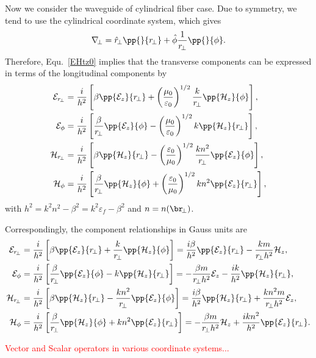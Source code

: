 Now we consider the waveguide of cylindrical fiber case. Due to symmetry, we tend to use the 
cylindrical coordinate system, which gives 
\begin{align}
\nabla\!_\perp = \hat{r}\!_\perp \pp{}{r\!_\perp} + \hat{\phi} \frac{1}{r\!_\perp} \pp{}{\phi}.
\end{align}
Therefore, Equ.~\ref{EHtz0} implies that the transverse components can be expressed in terms of the 
longitudinal components by
\begin{subequations}
\begin{align}
\mathcal{E}_{r\!_\perp} &= \frac{i}{h^2} \left[ \beta \pp{\mathcal{E}_z }{r\!_\perp} + 
\left(\frac{\mu_0}{\varepsilon_0} \right)^{1/2}  \frac{k}{r\!_\perp} 
\pp{\mathcal{H}_z}{\phi} \right], \\
\mathcal{E}_\phi &= \frac{i}{h^2} \left[\frac{\beta}{r\!_\perp} 
\pp{\mathcal{E}_z}{\phi} -\left(\frac{\mu_0}{\varepsilon_0} \right) ^{1/2} k 
\pp{\mathcal{H}_z}{r\!_\perp} 
\right],\\
\mathcal{H}_{r\!_\perp} &= \frac{i}{h^2} \left[ \beta \pp{\mathcal{H}_z}{r\!_\perp} 
-\left(\frac{\varepsilon_0}{\mu_0} \right)^{1/2} \frac{kn^2}{r\!_\perp}\pp{\mathcal{E}_z}{\phi} \right],\\
\mathcal{H}_\phi &= \frac{i}{h^2} \left[ \frac{\beta}{r\!_\perp} \pp{\mathcal{H}_z}{\phi} + 
\left(\frac{\varepsilon_0}{\mu_0} \right)^{1/2} kn^2 \pp{\mathcal{E}_z}{r\!_\perp} \right],
\end{align}
\end{subequations}
with $ h^2= k^2n^2-\beta^2=k^2 \varepsilon_f -\beta^2  $ and $ n=n(\br\!_\perp) $. 

Correspondingly, the component relationships in Gauss units are
\begin{subequations}\label{EHzgauss}
\begin{align}
\mathcal{E}_{r\!_\perp} &= \frac{i}{h^2} \left[ \beta \pp{\mathcal{E}_z }{r\!_\perp} + 
  \frac{k}{r\!_\perp} 
\pp{\mathcal{H}_z}{\phi} \right]= \frac{i\beta}{h^2} \pp{\mathcal{E}_z }{r\!_\perp} - 
  \frac{km}{r\!_\perp h^2} {\mathcal{H}_z}, \\
\mathcal{E}_\phi &= \frac{i}{h^2} \left[\frac{\beta}{r\!_\perp} 
\pp{\mathcal{E}_z}{\phi} - k 
\pp{\mathcal{H}_z}{r\!_\perp} 
\right] = -\frac{\beta m}{r\!_\perp h^2} 
{\mathcal{E}_z} - \frac{ik}{h^2} 
\pp{\mathcal{H}_z}{r\!_\perp},\\
\mathcal{H}_{r\!_\perp} &= \frac{i}{h^2} \left[ \beta \pp{\mathcal{H}_z}{r\!_\perp} 
- \frac{kn^2}{r\!_\perp}\pp{\mathcal{E}_z}{\phi} \right]= \frac{i\beta}{h^2} \pp{\mathcal{H}_z}{r\!_\perp} 
+ \frac{kn^2m}{r\!_\perp h^2} {\mathcal{E}_z},\\
\mathcal{H}_\phi &= \frac{i}{h^2} \left[ \frac{\beta}{r\!_\perp} \pp{\mathcal{H}_z}{\phi} + 
 kn^2 \pp{\mathcal{E}_z}{r\!_\perp} \right] = -\frac{\beta m}{r\!_\perp h^2} {\mathcal{H}_z} + 
  \frac{ikn^2}{h^2} \pp{\mathcal{E}_z}{r\!_\perp}.
\end{align}
\end{subequations}


\textcolor{red}{Vector and Scalar operators in various coordinate systems...}

